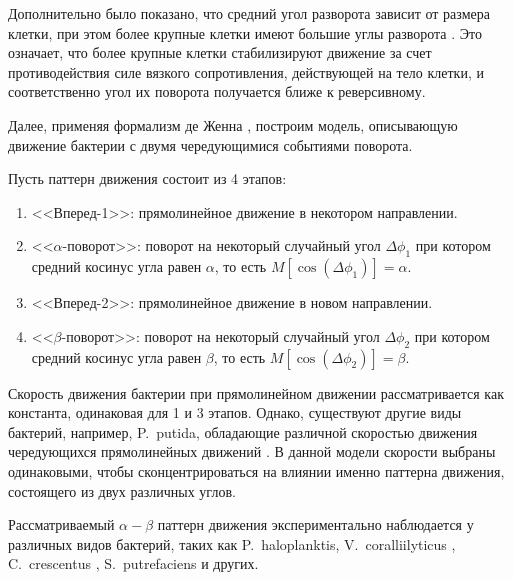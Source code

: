 Дополнительно было показано, что средний угол разворота зависит от размера клетки, при этом более крупные клетки имеют большие углы разворота \cite{taute_high-throughput_2015}. Это означает, что более крупные клетки стабилизируют движение за счет противодействия силе вязкого сопротивления, действующей на тело клетки, и соответственно угол их поворота получается ближе к реверсивному. 

Далее, применяя формализм де Женна \cite{de_gennes_chemotaxis_2004}, построим модель, описывающую движение бактерии с двумя чередующимися событиями поворота.

Пусть паттерн движения состоит из 4 этапов: 
\begin{enumerate}
  \item <<Вперед-1>>: прямолинейное движение в некотором направлении.
  \item <<$\alpha$-поворот>>: поворот на некоторый случайный угол $\Delta\phi_1$ при котором средний косинус угла равен $\alpha$, то есть $M[\cos (\Delta\phi_1)]=\alpha$.
  \item <<Вперед-2>>: прямолинейное движение в новом направлении.
  \item <<$\beta$-поворот>>: поворот на некоторый случайный угол $\Delta\phi_2$ при котором средний косинус угла равен $\beta$, то есть $M[\cos (\Delta\phi_2)]=\beta$.
\end{enumerate}

Скорость движения бактерии при прямолинейном движении рассматривается как константа, одинаковая для 1 и 3 этапов. Однако, существуют другие виды бактерий, например, P.~putida, обладающие различной скоростью движения чередующихся прямолинейных движений \cite{theves_bacterial_2013}. В данной модели скорости выбраны одинаковыми, чтобы сконцентрироваться на влиянии именно паттерна движения, состоящего из двух различных углов.

Рассматриваемый $\alpha-\beta$ паттерн движения экспериментально наблюдается у различных видов бактерий, таких как P.~haloplanktis, V.~coralliilyticus \cite{son_bacteria_2013}, C.~crescentus \cite{liu_helical_2014}, S.~putrefaciens \cite{stocker_reverse_2011} и других. 

